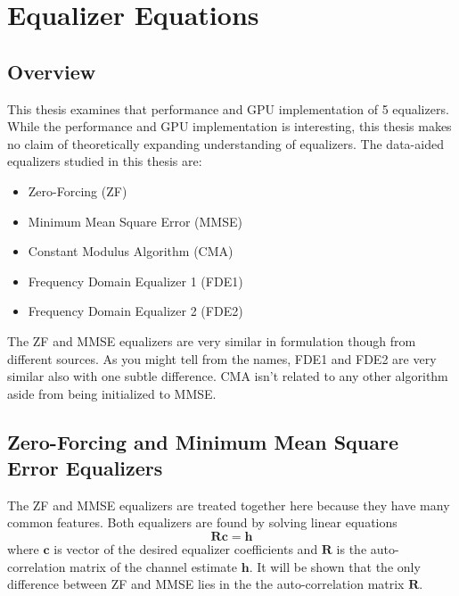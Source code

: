 
\chapter{Equalizer Equations}
\label{sec:eq_eq}

\section{Overview}
This thesis examines that performance and GPU implementation of 5 equalizers.
While the performance and GPU implementation is interesting, this thesis makes no claim of theoretically expanding understanding of equalizers.
The data-aided equalizers studied in this thesis are:
\begin{itemize}
\item Zero-Forcing (ZF)
\item Minimum Mean Square Error (MMSE)
\item Constant Modulus Algorithm (CMA)
\item Frequency Domain Equalizer 1 (FDE1)
\item Frequency Domain Equalizer 2 (FDE2)
\end{itemize}

The ZF and MMSE equalizers are very similar in formulation though from different sources.
As you might tell from the names, FDE1 and FDE2 are very similar also with one subtle difference.
CMA isn't related to any other algorithm aside from being initialized to MMSE.

\section{Zero-Forcing and Minimum Mean Square Error Equalizers}

The ZF and MMSE equalizers are treated together here because they have many common features.
Both equalizers are found by solving linear equations
\begin{equation}
\mathbf{R}\mathbf{c} = \mathbf{h}
\end{equation}
where $\mathbf{c}$ is vector of the desired equalizer coefficients
and $\mathbf{R}$ is the auto-correlation matrix of the channel estimate $\mathbf{h}$.
It will be shown that the only difference between ZF and MMSE lies in the the auto-correlation matrix $\mathbf{R}$.

